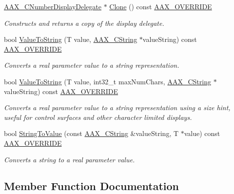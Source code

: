 \begin{DoxyCompactItemize}
\item 
\mbox{\hyperlink{a01509}{A\+A\+X\+\_\+\+C\+Number\+Display\+Delegate}} $\ast$ \mbox{\hyperlink{a01509_ab92a0973a7ed56034aa269c760d6b935}{Clone}} () const \mbox{\hyperlink{a00392_ac2f24a5172689ae684344abdcce55463}{A\+A\+X\+\_\+\+O\+V\+E\+R\+R\+I\+DE}}
\begin{DoxyCompactList}\small\item\em Constructs and returns a copy of the display delegate. \end{DoxyCompactList}\item 
bool \mbox{\hyperlink{a01509_a260439b47a0890a008f7984958e11662}{Value\+To\+String}} (T value, \mbox{\hyperlink{a01573}{A\+A\+X\+\_\+\+C\+String}} $\ast$value\+String) const \mbox{\hyperlink{a00392_ac2f24a5172689ae684344abdcce55463}{A\+A\+X\+\_\+\+O\+V\+E\+R\+R\+I\+DE}}
\begin{DoxyCompactList}\small\item\em Converts a real parameter value to a string representation. \end{DoxyCompactList}\item 
bool \mbox{\hyperlink{a01509_a8cb553887b6a334fbcb6432770c67ed8}{Value\+To\+String}} (T value, int32\+\_\+t max\+Num\+Chars, \mbox{\hyperlink{a01573}{A\+A\+X\+\_\+\+C\+String}} $\ast$value\+String) const \mbox{\hyperlink{a00392_ac2f24a5172689ae684344abdcce55463}{A\+A\+X\+\_\+\+O\+V\+E\+R\+R\+I\+DE}}
\begin{DoxyCompactList}\small\item\em Converts a real parameter value to a string representation using a size hint, useful for control surfaces and other character limited displays. \end{DoxyCompactList}\item 
bool \mbox{\hyperlink{a01509_ad7fba7856368f7ffe4398e6efd65dfa5}{String\+To\+Value}} (const \mbox{\hyperlink{a01573}{A\+A\+X\+\_\+\+C\+String}} \&value\+String, T $\ast$value) const \mbox{\hyperlink{a00392_ac2f24a5172689ae684344abdcce55463}{A\+A\+X\+\_\+\+O\+V\+E\+R\+R\+I\+DE}}
\begin{DoxyCompactList}\small\item\em Converts a string to a real parameter value. \end{DoxyCompactList}\end{DoxyCompactItemize}


\subsection{Member Function Documentation}
\mbox{\label{a01509_ab92a0973a7ed56034aa269c760d6b935}} 
